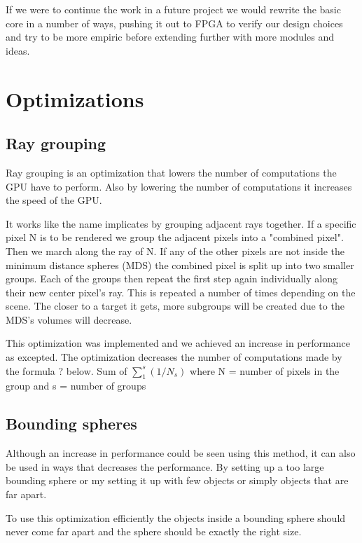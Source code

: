 			If we were to continue the work in a future project we would
			rewrite the basic core in a number of ways, pushing it out to FPGA
			to verify our design choices and try to be more empiric before
			extending further with more modules and ideas. 

	\section{Optimizations} \label{optimization}

		\subsection{Ray grouping}
		
			Ray grouping is an optimization that lowers the number of
			computations the GPU have to perform. Also by lowering the number
			of computations it increases the speed of the GPU.
			
			It works like the name implicates by grouping adjacent rays
			together. If a specific pixel N is to be rendered we group the
			adjacent pixels into a "combined pixel". Then we march along the
			ray of N. If any of the other pixels are not inside the minimum
			distance spheres (MDS) the combined pixel is split up into two
			smaller groups. Each of the groups then repeat the first step again
			individually along their new center pixel's ray. This is repeated a
			number of times depending on the scene.  The closer to a target it
			gets, more subgroups will be created due to the MDS's volumes will
			decrease.
			
			This optimization was implemented and we achieved an increase in
			performance as excepted. The optimization decreases the number of
			computations made by the formula ? below.  Sum of $\sum_1^s(1/N_s)$
			where N = number of pixels in the group and s = number of groups


		\subsection{Bounding spheres}
			
			Although an increase in performance could be seen using this
			method, it can also be used in ways that decreases the performance.
			By setting up a too large bounding sphere or my setting it up with
			few objects or simply objects that are far apart.

			To use this optimization efficiently the objects inside a bounding 
			sphere should never come far apart and the sphere should be exactly 
			the right size.

